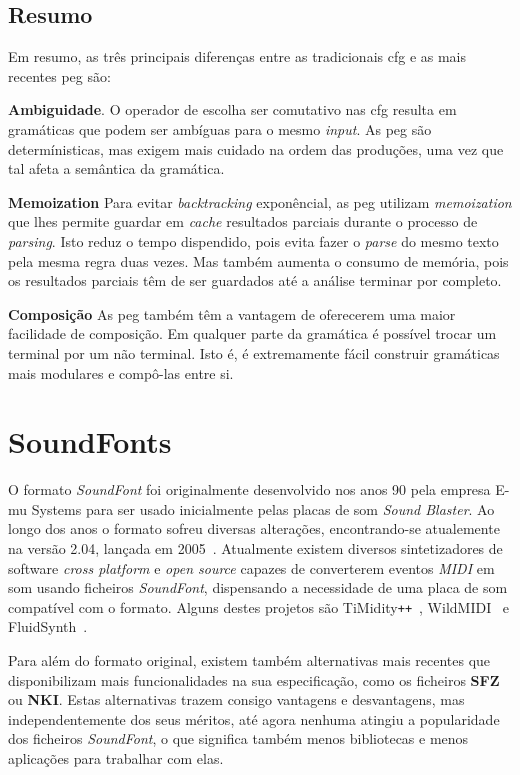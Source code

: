 
\subsection{Resumo}
Em resumo, as três principais diferenças entre as tradicionais \acrfull{cfg} e as mais recentes \acrfull{peg} são:

\textbf{Ambiguidade}. O operador de escolha ser comutativo nas \acrshort{cfg} resulta em gramáticas que podem ser ambíguas para o mesmo \textit{input}. As \acrshort{peg} são determínisticas, mas exigem mais cuidado na ordem das produções, uma vez que tal afeta a semântica da gramática.

\textbf{Memoization} Para evitar \textit{backtracking} exponêncial, as \acrshort{peg} utilizam \textit{memoization} que lhes permite guardar em \textit{cache} resultados parciais durante o processo de \textit{parsing}. Isto reduz o tempo dispendido, pois evita fazer o \textit{parse} do mesmo texto pela mesma regra duas vezes. Mas também aumenta o consumo de memória, pois os resultados parciais têm de ser guardados até a análise terminar por completo.

\textbf{Composição} As \acrlong{peg} também têm a vantagem de oferecerem uma maior facilidade de composição. Em qualquer parte da gramática é possível trocar um terminal por um não terminal. Isto é, é extremamente fácil construir gramáticas mais modulares e compô-las entre si.

\section{SoundFonts}
O formato \textit{SoundFont} foi originalmente desenvolvido nos anos 90 pela empresa E-mu Systems para ser usado inicialmente pelas placas de som \textit{Sound Blaster}. Ao longo dos anos o formato sofreu diversas alterações, encontrando-se atualemente na versão 2.04, lançada em 2005~\cite{soundfont}. Atualmente existem diversos sintetizadores de software \textit{cross platform} e \textit{open source} capazes de converterem eventos \textit{MIDI} em som usando ficheiros \textit{SoundFont}, dispensando a necessidade de uma placa de som compatível com o formato. Alguns destes projetos são TiMidity\verb|++|~\cite{timidity}, WildMIDI~\cite{wild-midi} e FluidSynth~\cite{fluidsynth}.

Para além do formato original, existem também alternativas mais recentes que disponibilizam mais funcionalidades na sua especificação, como os ficheiros \textbf{SFZ} ou \textbf{NKI}. Estas alternativas trazem consigo vantagens e desvantagens, mas independentemente dos seus méritos, até agora nenhuma atingiu a popularidade dos ficheiros \textit{SoundFont}, o que significa também menos bibliotecas e menos aplicações para trabalhar com elas.

